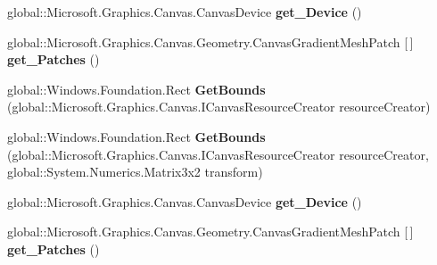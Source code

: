 \begin{DoxyCompactItemize}
\item 
\mbox{\label{interface_microsoft_1_1_graphics_1_1_canvas_1_1_geometry_1_1_i_canvas_gradient_mesh_a68a310ad09ab7904bbc54422f689cf20}} 
global\+::\+Microsoft.\+Graphics.\+Canvas.\+Canvas\+Device {\bfseries get\+\_\+\+Device} ()
\item 
\mbox{\label{interface_microsoft_1_1_graphics_1_1_canvas_1_1_geometry_1_1_i_canvas_gradient_mesh_a0c0aede79e9bd4a377b1c963cc2ebdc2}} 
global\+::\+Microsoft.\+Graphics.\+Canvas.\+Geometry.\+Canvas\+Gradient\+Mesh\+Patch \mbox{[}$\,$\mbox{]} {\bfseries get\+\_\+\+Patches} ()
\item 
\mbox{\label{interface_microsoft_1_1_graphics_1_1_canvas_1_1_geometry_1_1_i_canvas_gradient_mesh_a60495941d0df177b0c3211c88f21395d}} 
global\+::\+Windows.\+Foundation.\+Rect {\bfseries Get\+Bounds} (global\+::\+Microsoft.\+Graphics.\+Canvas.\+I\+Canvas\+Resource\+Creator resource\+Creator)
\item 
\mbox{\label{interface_microsoft_1_1_graphics_1_1_canvas_1_1_geometry_1_1_i_canvas_gradient_mesh_af752134439dc779ececd8c807383c753}} 
global\+::\+Windows.\+Foundation.\+Rect {\bfseries Get\+Bounds} (global\+::\+Microsoft.\+Graphics.\+Canvas.\+I\+Canvas\+Resource\+Creator resource\+Creator, global\+::\+System.\+Numerics.\+Matrix3x2 transform)
\item 
\mbox{\label{interface_microsoft_1_1_graphics_1_1_canvas_1_1_geometry_1_1_i_canvas_gradient_mesh_a68a310ad09ab7904bbc54422f689cf20}} 
global\+::\+Microsoft.\+Graphics.\+Canvas.\+Canvas\+Device {\bfseries get\+\_\+\+Device} ()
\item 
\mbox{\label{interface_microsoft_1_1_graphics_1_1_canvas_1_1_geometry_1_1_i_canvas_gradient_mesh_a0c0aede79e9bd4a377b1c963cc2ebdc2}} 
global\+::\+Microsoft.\+Graphics.\+Canvas.\+Geometry.\+Canvas\+Gradient\+Mesh\+Patch \mbox{[}$\,$\mbox{]} {\bfseries get\+\_\+\+Patches} ()

\end{DoxyCompactItemize}
